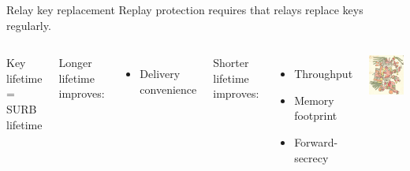 \documentclass[fleqn,xcolor={usenames,dvipsnames}]{beamer}
\begin{document}
\begin{frame}[t]{Relay key replacement }
Replay protection requires that relays replace keys regularly. 
\begin{columns}[T]
{\hfil Key lifetime = SURB lifetime \hfil}

\medskip
Longer lifetime improves:
\begin{itemize}
\item Delivery convenience
\end{itemize}

\smallskip
Shorter lifetime improves:
\begin{itemize}
\item Throughput 
\item Memory footprint
\item Forward-secrecy
\end{itemize}

\includegraphics[width=1.2\textwidth]{../pics/Xolotl}
\end{columns}
\end{frame}
\end{document}
